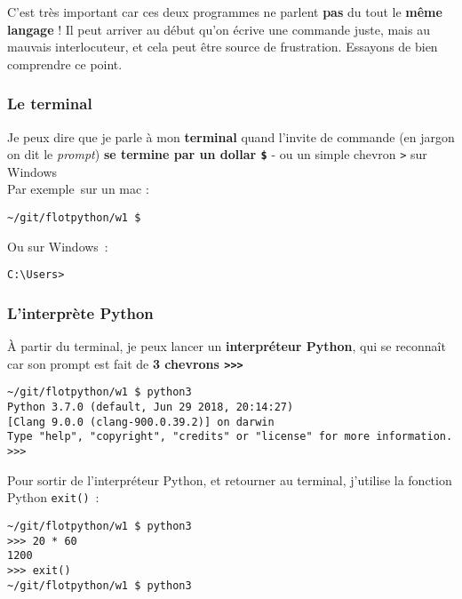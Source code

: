 C'est très important car ces deux programmes ne parlent \textbf{pas} du
tout le \textbf{même langage} ! Il peut arriver au début qu'on écrive
une commande juste, mais au mauvais interlocuteur, et cela peut être
source de frustration. Essayons de bien comprendre ce point.

    \hypertarget{le-terminal}{%
\subsubsection{Le terminal}\label{le-terminal}}

Je peux dire que je parle à mon \textbf{terminal} quand l'invite de
commande (en jargon on dit le \emph{prompt}) \textbf{se termine par un
dollar \texttt{\$}} - ou un simple chevron \texttt{\textgreater{}} sur
Windows\\

Par exemple~sur un mac :

\begin{verbatim}
~/git/flotpython/w1 $ 
\end{verbatim}

Ou sur Windows~:

\begin{verbatim}
C:\Users>        
\end{verbatim}

    \hypertarget{linterpruxe8te-python}{%
\subsubsection{L'interprète Python}\label{linterpruxe8te-python}}

À partir du terminal, je peux lancer un \textbf{interpréteur Python},
qui se reconnaît car son prompt est fait de \textbf{3 chevrons
\texttt{\textgreater{}\textgreater{}\textgreater{}}}

\begin{verbatim}
~/git/flotpython/w1 $ python3
Python 3.7.0 (default, Jun 29 2018, 20:14:27)
[Clang 9.0.0 (clang-900.0.39.2)] on darwin
Type "help", "copyright", "credits" or "license" for more information.
>>>
\end{verbatim}

    Pour sortir de l'interpréteur Python, et retourner au terminal,
j'utilise la fonction Python \texttt{exit()}~:

\begin{verbatim}
~/git/flotpython/w1 $ python3
>>> 20 * 60
1200
>>> exit()
~/git/flotpython/w1 $ python3
\end{verbatim}

